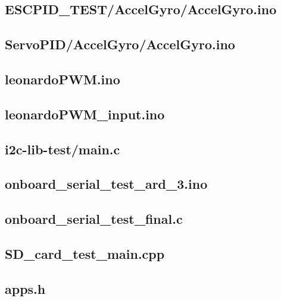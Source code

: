 \documentclass[a4paper,11pt]{article}
\begin{document}
\subsection{ESCPID\_TEST/AccelGyro/AccelGyro.ino}

\subsection{ServoPID/AccelGyro/AccelGyro.ino}

\subsection{leonardoPWM.ino}

\subsection{leonardoPWM\_input.ino}

   \subsection{i2c-lib-test/main.c}
 
   \subsection{onboard\_serial\_test\_ard\_3.ino}
  
   \subsection{onboard\_serial\_test\_final.c}
  
    \subsection{SD\_card\_test\_main.cpp}
 
    \subsection{apps.h}
   
\end{document}
